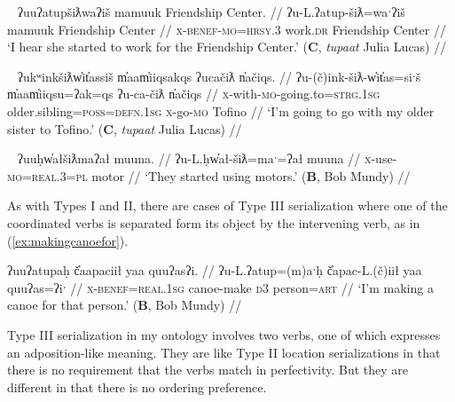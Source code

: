 \ex~ \label{ex:starttoworkfor2}
\begingl
\glpreamble ʔuuʔatupšiƛwaʔiš mamuuk Friendship Center. //
\gla ʔu-L.ʔatup-šiƛ=waˑʔiš mamuuk Friendship Center //
\glb \textsc{x}-\textsc{benef}-\textsc{mo}=\textsc{hrsy.3} work.\textsc{dr} Friendship Center //
\glft `I hear she started to work for the Friendship Center.' (\textbf{C}, \textit{tupaat} Julia Lucas) //
\endgl
\xe

\ex~ \label{ex:starttobewith}
\begingl
\glpreamble ʔukʷinkšiƛw̓it̓assiš m̓aam̓iiqsakqs ʔucačiƛ n̓ačiqs. //
\gla ʔu-(č)ink-šiƛ-w̓it̓as=siˑš m̓aam̓iiqsu=ʔak=qs ʔu-ca-čiƛ n̓ačiqs //
\glb \textsc{x}-with-\textsc{mo}-going.to=\textsc{strg.1sg} older.sibling=\textsc{poss}=\textsc{defn.1sg} \textsc{x}-go-\textsc{mo} Tofino //
\glft `I'm going to go with my older sister to Tofino.' (\textbf{C}, \textit{tupaat} Julia Lucas) //
\endgl
\xe

\ex~ \label{ex:starttouse}
\begingl
\glpreamble ʔuuḥw̓ałšiƛmaʔał muuna. //
\gla ʔu-L.ḥw̓ał-šiƛ=maˑ=ʔał muuna //
\glb \textsc{x}-use-\textsc{mo}=\textsc{real.3}=\textsc{pl} motor //
\glft `They started using motors.' (\textbf{B}, Bob Mundy) //
\endgl
\xe

As with Types I and  II, there are cases of Type III serialization where one of the coordinated verbs is separated form its object by the intervening verb, as in (\ref{ex:makingcanoefor}).

\ex \label{ex:makingcanoefor}
\begingl
\glpreamble ʔuuʔatupaḥ č̓aapaciił yaa quuʔasʔi. //
\gla ʔu-L.ʔatup=(m)aˑḥ č̓apac-L.(č)iił yaa quuʔas=ʔiˑ //
\glb \textsc{x}-\textsc{benef}=\textsc{real.1sg} canoe-make \textsc{d3} person=\textsc{art} //
\glft `I'm making a canoe for that person.' (\textbf{B}, Bob Mundy) //
\endgl
\xe

Type III serialization in my ontology involves two verbs, one of which expresses an adposition-like meaning. They are like Type II location serializations in that there is no requirement that the verbs match in perfectivity. But they are different in that there is no ordering preference.

\vspace{10pt}

